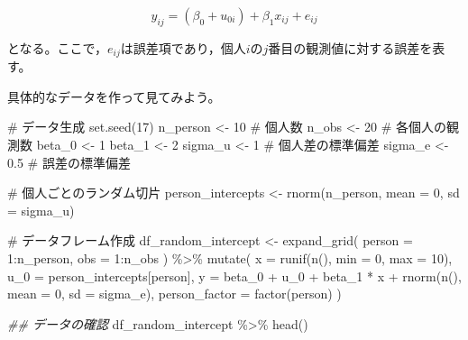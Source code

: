 \documentclass[
  a4paper,
]{ltjsbook}
\newenvironment{Shaded}{\begin{snugshade}}{\end{snugshade}}
\newcommand{\AttributeTok}[1]{\textcolor[rgb]{0.40,0.45,0.13}{#1}}
\newcommand{\CommentTok}[1]{\textcolor[rgb]{0.37,0.37,0.37}{#1}}
\newcommand{\DecValTok}[1]{\textcolor[rgb]{0.68,0.00,0.00}{#1}}
\newcommand{\DocumentationTok}[1]{\textcolor[rgb]{0.37,0.37,0.37}{\textit{#1}}}
\newcommand{\FloatTok}[1]{\textcolor[rgb]{0.68,0.00,0.00}{#1}}
\newcommand{\FunctionTok}[1]{\textcolor[rgb]{0.28,0.35,0.67}{#1}}
\newcommand{\NormalTok}[1]{\textcolor[rgb]{0.00,0.23,0.31}{#1}}
\newcommand{\OtherTok}[1]{\textcolor[rgb]{0.00,0.23,0.31}{#1}}
\newcommand{\SpecialCharTok}[1]{\textcolor[rgb]{0.37,0.37,0.37}{#1}}
\begin{document}
\[
y_{ij} = (\beta_0 + u_{0i}) + \beta_1 x_{ij} + e_{ij}
\]

となる。ここで，\(e_{ij}\)は誤差項であり，個人\(i\)の\(j\)番目の観測値に対する誤差を表す。

具体的なデータを作って見てみよう。

\begin{Shaded}
\begin{Highlighting}[]
\CommentTok{\# データ生成}
\FunctionTok{set.seed}\NormalTok{(}\DecValTok{17}\NormalTok{)}
\NormalTok{n\_person }\OtherTok{\textless{}{-}} \DecValTok{10}  \CommentTok{\# 個人数}
\NormalTok{n\_obs }\OtherTok{\textless{}{-}} \DecValTok{20}     \CommentTok{\# 各個人の観測数}
\NormalTok{beta\_0 }\OtherTok{\textless{}{-}} \DecValTok{1}
\NormalTok{beta\_1 }\OtherTok{\textless{}{-}} \DecValTok{2}
\NormalTok{sigma\_u }\OtherTok{\textless{}{-}} \DecValTok{1}    \CommentTok{\# 個人差の標準偏差}
\NormalTok{sigma\_e }\OtherTok{\textless{}{-}} \FloatTok{0.5}  \CommentTok{\# 誤差の標準偏差}

\CommentTok{\# 個人ごとのランダム切片}
\NormalTok{person\_intercepts }\OtherTok{\textless{}{-}} \FunctionTok{rnorm}\NormalTok{(n\_person, }\AttributeTok{mean =} \DecValTok{0}\NormalTok{, }\AttributeTok{sd =}\NormalTok{ sigma\_u)}

\CommentTok{\# データフレーム作成}
\NormalTok{df\_random\_intercept }\OtherTok{\textless{}{-}} \FunctionTok{expand\_grid}\NormalTok{(}
  \AttributeTok{person =} \DecValTok{1}\SpecialCharTok{:}\NormalTok{n\_person,}
  \AttributeTok{obs =} \DecValTok{1}\SpecialCharTok{:}\NormalTok{n\_obs}
\NormalTok{) }\SpecialCharTok{\%\textgreater{}\%}
  \FunctionTok{mutate}\NormalTok{(}
    \AttributeTok{x =} \FunctionTok{runif}\NormalTok{(}\FunctionTok{n}\NormalTok{(), }\AttributeTok{min =} \DecValTok{0}\NormalTok{, }\AttributeTok{max =} \DecValTok{10}\NormalTok{),}
    \AttributeTok{u\_0 =}\NormalTok{ person\_intercepts[person],}
    \AttributeTok{y =}\NormalTok{ beta\_0 }\SpecialCharTok{+}\NormalTok{ u\_0 }\SpecialCharTok{+}\NormalTok{ beta\_1 }\SpecialCharTok{*}\NormalTok{ x }\SpecialCharTok{+} \FunctionTok{rnorm}\NormalTok{(}\FunctionTok{n}\NormalTok{(), }\AttributeTok{mean =} \DecValTok{0}\NormalTok{, }\AttributeTok{sd =}\NormalTok{ sigma\_e),}
    \AttributeTok{person\_factor =} \FunctionTok{factor}\NormalTok{(person)}
\NormalTok{  )}

\DocumentationTok{\#\# データの確認}
\NormalTok{df\_random\_intercept }\SpecialCharTok{\%\textgreater{}\%} \FunctionTok{head}\NormalTok{()}
\end{Highlighting}
\end{Shaded}
\end{document}
